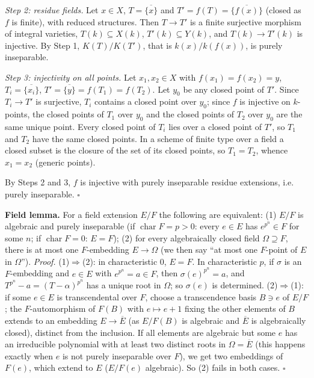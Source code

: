 \documentclass[11pt]{article}
\begin{document}
\emph{Step 2: residue fields.} Let $x\in X$, $T=\overline{\{x\}}$ and $T'=f(T)=\overline{\{f(x)\}}$ (closed as $f$ is finite), with reduced structures. Then $T\to T'$ is a finite surjective morphism of integral varieties, $T(k)\subseteq X(k)$, $T'(k)\subseteq Y(k)$, and $T(k)\to T'(k)$ is injective. By Step 1, $K(T)/K(T')$, that is $k(x)/k(f(x))$, is purely inseparable.

\emph{Step 3: injectivity on all points.} Let $x_1,x_2\in X$ with $f(x_1)=f(x_2)=y$, $T_i=\overline{\{x_i\}}$, $T'=\overline{\{y\}}=f(T_1)=f(T_2)$. Let $y_0$ be any closed point of $T'$. Since $T_i\to T'$ is surjective, $T_i$ contains a closed point over $y_0$; since $f$ is injective on $k$-points, the closed points of $T_1$ over $y_0$ and the closed points of $T_2$ over $y_0$ are the same unique point. Every closed point of $T_i$ lies over a closed point of $T'$, so $T_1$ and $T_2$ have the same closed points. In a scheme of finite type over a field a closed subset is the closure of the set of its closed points, so $T_1=T_2$, whence $x_1=x_2$ (generic points).

By Steps 2 and 3, $f$ is injective with purely inseparable residue extensions, i.e. purely inseparable. \hfill$\square$

\pf
\textbf{Field lemma.} For a field extension $E/F$ the following are equivalent: (1) $E/F$ is algebraic and purely inseparable (if $\operatorname{char}F=p>0$: every $e\in E$ has $e^{p^n}\in F$ for some $n$; if $\operatorname{char}F=0$: $E=F$); (2) for every algebraically closed field $\Omega\supseteq F$, there is at most one $F$-embedding $E\to\Omega$ (we then say ``at most one $F$-point of $E$ in $\Omega$'').
\emph{Proof.} (1)$\Rightarrow$(2): in characteristic $0$, $E=F$. In characteristic $p$, if $\sigma$ is an $F$-embedding and $e\in E$ with $e^{p^n}=a\in F$, then $\sigma(e)^{p^n}=a$, and $T^{p^n}-a=(T-\alpha)^{p^n}$ has a unique root in $\Omega$; so $\sigma(e)$ is determined. (2)$\Rightarrow$(1): if some $e\in E$ is transcendental over $F$, choose a transcendence basis $B\ni e$ of $E/F$; the $F$-automorphism of $F(B)$ with $e\mapsto e+1$ fixing the other elements of $B$ extends to an embedding $E\to\overline E$ (as $E/F(B)$ is algebraic and $\overline E$ is algebraically closed), distinct from the inclusion. If all elements are algebraic but some $e$ has an irreducible polynomial with at least two distinct roots in $\Omega=\overline E$ (this happens exactly when $e$ is not purely inseparable over $F$), we get two embeddings of $F(e)$, which extend to $E$ ($E/F(e)$ algebraic). So (2) fails in both cases. \hfill$\square$
\end{document}
